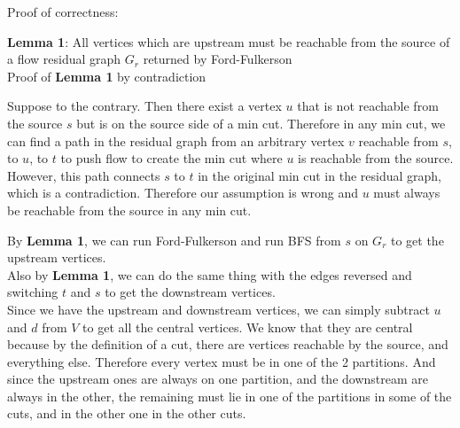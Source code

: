 \documentclass[12pt]{article}
\begin{document}
Proof of correctness:
\begin{adjustwidth}{10mm}{}
	\textbf{Lemma 1}: All vertices which are upstream must be reachable from the source of a flow residual
	graph $G_r$ returned by Ford-Fulkerson\\

	Proof of \textbf{Lemma 1} by contradiction
	\begin{adjustwidth}{10mm}{}
		Suppose to the contrary. Then there exist a vertex $u$ that is not reachable from the source $s$ but
		is on the source side of a min cut. Therefore in any min cut, we can find a path in the residual graph
		from an arbitrary vertex $v$ reachable from $s$, to $u$, to $t$ to push flow to create the min cut where $u$ is
		reachable from the source. However, this path connects $s$ to $t$ in the original min cut in the residual graph,
		which is a contradiction. Therefore our assumption is wrong and $u$ must always be reachable from the source in
		any min cut.\\
	\end{adjustwidth}

	By \textbf{Lemma 1}, we can run Ford-Fulkerson and run BFS from $s$ on $G_r$ to get the upstream vertices. \\
	Also by \textbf{Lemma 1}, we can do the same thing with the edges reversed and switching $t$ and $s$
	to get the downstream vertices.\\

	Since we have the upstream and downstream vertices, we can simply
	subtract $u$ and $d$ from $V$ to get all the central vertices. We know that they are central because
	by the definition of a cut, there are vertices reachable by the source, and everything else. Therefore every vertex
	must be in one of the 2 partitions. And since the upstream ones are always on one partition, and the downstream are always
	in the other, the remaining must lie in one of the partitions in some of the cuts, and in the other one in the other cuts.
\end{adjustwidth}
\end{document}
